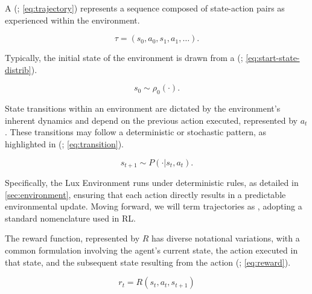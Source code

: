     \bigskip
    
    \noindent A  (\textcolor{deepblue}{\cite{Sutton1998}; \autoref{eq:trajectory}}) represents a sequence composed of state-action pairs as experienced within the environment.
    
    \begin{equation}
        \tau = (s_0, a_0, s_1, a_1, \hdots).
        \label{eq:trajectory}
    \end{equation}
    
    \noindent Typically, the initial state of the environment is drawn from a  (\textcolor{deepblue}{\cite{Sutton1998}; \autoref{eq:start-state-distrib}}).
    
    \begin{equation}
        s_0 \sim \rho_0(\cdot).
        \label{eq:start-state-distrib}
    \end{equation}
    
    \noindent State transitions within an environment are dictated by the environment's inherent dynamics and depend on the previous action executed, represented by $a_t$. These transitions may follow a deterministic or stochastic pattern, as highlighted in (\textcolor{deepblue}{\cite{Sutton1998}; \autoref{eq:transition}}). 
    
    \begin{equation}
        s_{t+1} \sim P(\cdot | s_t, a_t).
        \label{eq:transition}
    \end{equation}
    
    \noindent Specifically, the Lux Environment runs under deterministic rules, as detailed in \autoref{sec:environment}, ensuring that each action directly results in a predictable environmental update. Moving forward, we will term trajectories as , adopting a standard nomenclature used in RL.
    
    \bigskip
    
    \noindent The reward function, represented by $R$ has diverse notational variations, with a common formulation involving the agent's current state, the action executed in that state, and the subsequent state resulting from the action (\textcolor{deepblue}{\cite{Sutton1998}; \autoref{eq:reward}}).
    
    \begin{equation}
        r_t = R(s_t, a_t, s_{t+1})
        \label{eq:reward}
    \end{equation}
    
